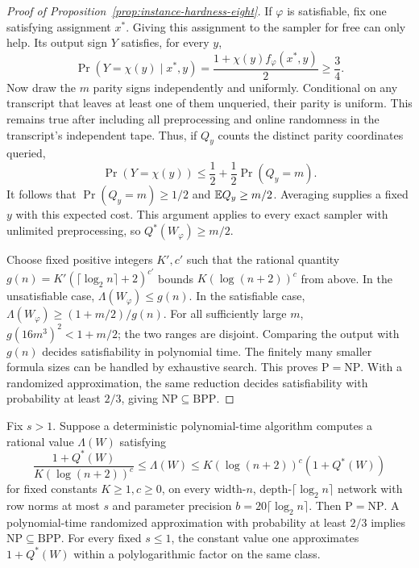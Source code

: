 \begin{proof}[Proof of Proposition~\ref{prop:instance-hardness-eight}]
If \(\varphi\) is satisfiable, fix one satisfying assignment
\(x^*\).  Giving this assignment to the sampler for free can
only help.  Its output sign \(Y\) satisfies, for every \(y\),
\[
 \Pr(Y=\chi(y)\mid x^*,y)
 =\frac{1+\chi(y)f_\varphi(x^*,y)}2\ge\frac34.
\]
Now draw the \(m\) parity signs independently and uniformly.
Conditional on any transcript that leaves at least one of them
unqueried, their parity is uniform.  This remains true after
including all preprocessing and online randomness in the
transcript's independent tape.  Thus, if \(Q_y\) counts the
distinct parity coordinates queried,
\[
 \Pr(Y=\chi(y))
 \le\frac12+\frac12\Pr(Q_y=m).
\]
It follows that \(\Pr(Q_y=m)\ge1/2\) and
\(\mathbb E Q_y\ge m/2\).  Averaging supplies a fixed \(y\) with
this expected cost.  This argument applies to every exact sampler
with unlimited preprocessing, so \(Q^*(W_\varphi)\ge m/2\).

Choose fixed positive integers \(K',c'\) such that the rational
quantity \(g(n)=K'(\lceil\log_2n\rceil+2)^{c'}\) bounds
\(K(\log(n+2))^c\) from above.  In the unsatisfiable case,
\(\Lambda(W_\varphi)\le g(n)\).  In the satisfiable case,
\(\Lambda(W_\varphi)\ge(1+m/2)/g(n)\).  For all sufficiently
large \(m\), \(g(16m^3)^2<1+m/2\); the two ranges are
disjoint.  Comparing the output with \(g(n)\) decides
satisfiability in polynomial time.  The finitely many smaller
formula sizes can be handled by exhaustive search.  This proves
\(\mathrm P=\mathrm{NP}\).  With a randomized approximation,
the same reduction decides satisfiability with probability at
least \(2/3\), giving \(\mathrm{NP}\subseteq\mathrm{BPP}\).
\end{proof}

\begin{theorem}
\label{thm:instance-hardness}
Fix \(s>1\).  Suppose a deterministic polynomial-time algorithm
computes a rational value \(\Lambda(W)\) satisfying
\[
 \frac{1+Q^*(W)}{K(\log(n+2))^c}
 \le\Lambda(W)\le
 K(\log(n+2))^c(1+Q^*(W))
\]
for fixed constants \(K\ge1,c\ge0\), on every width-\(n\),
depth-\(\lceil\log_2n\rceil\) network with row norms at most
\(s\) and parameter precision \(b=20\lceil\log_2n\rceil\).
Then \(\mathrm P=\mathrm{NP}\).  A polynomial-time randomized
approximation with probability at least \(2/3\) implies
\(\mathrm{NP}\subseteq\mathrm{BPP}\).
For every fixed \(s\le1\), the constant value one approximates
\(1+Q^*(W)\) within a polylogarithmic factor on the same class.
\end{theorem}

